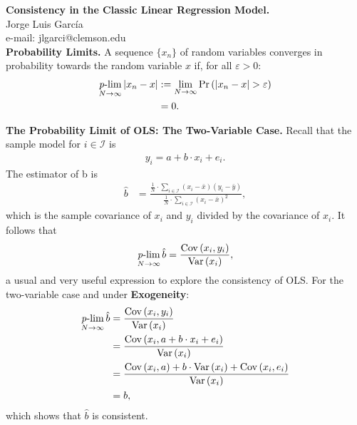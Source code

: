 
\let\counterwithout\relax
\let\counterwithin\relax
{}




\noindent \textbf{Consistency in the Classic Linear Regression Model.}\\
\noindent Jorge Luis García \\
\noindent e-mail: jlgarci@clemson.edu\\

\noindent \textbf{Probability Limits.} A sequence $\{ x_n \}$ of random variables converges in probability towards the random variable $x$ if, for all $\varepsilon > 0$: 
\begin{align}
	   \operatorname*{\mathit{p}-lim}_{N \rightarrow \infty} | x_{n} - x | & := \lim_{N \rightarrow \infty} \Pr \left( | x_{n} - x | > \varepsilon \right) \nonumber \\ 
									   & = 0. 
\end{align}

\noindent \textbf{The Probability Limit of OLS: The Two-Variable Case.} Recall that the sample model for $i \in \mathcal{I}$ is 
\begin{align}
	y_i = a + b \cdot x_i + e_i. 
\end{align}
\noindent The estimator of b is
\begin{align}
\hat{b} & =  \frac{ \frac{1}{N} \cdot \sum \limits _{i \in \mathcal{I} } \left( x_{i} - \bar{x} \right)  \left( y_{i} - \bar{y} \right) } { \frac{1}{N} \cdot \sum \limits _{i \in \mathcal{I} } { \left( x_{i} - \bar{x} \right) }^2 }, 
\end{align}
which is the sample covariance of $x_i$ and $y_i$ divided by the covariance of $x_i$. It follows that 
\begin{align}
	\operatorname*{\mathit{p}-lim}_{N \rightarrow \infty} \hat{b} = \frac{\operatorname{Cov} \left( x_i, y_i \right)} {\operatorname{Var} \left( x_i \right)}, 
\end{align}
\noindent a usual and very useful expression to explore the consistency of OLS. For the two-variable case and under \textbf{Exogeneity}: 
\begin{align}
		\operatorname*{\mathit{p}-lim}_{N \rightarrow \infty} \hat{b} & = \frac{\operatorname{Cov} \left( x_i, y_i \right)} {\operatorname{Var} \left( x_i \right)} \nonumber \\
											 & = \frac{\operatorname{Cov} \left( x_i, a + b \cdot x_i + e_i \right)} {\operatorname{Var} \left( x_i \right)} \\ 
											 & = \frac{\operatorname{Cov} \left( x_i, a \right) + b \cdot \operatorname{Var} \left( x_i \right) + \operatorname{Cov} \left( x_i,  e_i \right) } {\operatorname{Var} \left( x_i \right)} \nonumber \\ 
											 & = b,								 
\end{align}
\noindent which shows that $\hat{b}$ is consistent.\\

